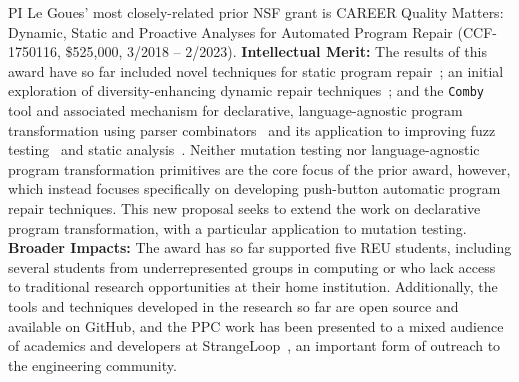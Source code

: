 PI Le Goues' most closely-related prior NSF grant is  CAREER
Quality Matters: Dynamic, Static and Proactive Analyses for Automated Program
Repair (CCF-1750116,  \$525,000,  3/2018 -- 2/2023).  \textbf{Intellectual
  Merit:} The results of this award have so far  
included novel techniques for static program repair~\cite{footpatch}; an initial
exploration of diversity-enhancing dynamic repair
techniques~\cite{Ding2019}; and the {\tt Comby} tool and associated mechanism for
declarative, language-agnostic program transformation using parser
combinators~\cite{rvt-ppc} and its application to improving fuzz testing~\cite{vantonder-ase18} and static analysis~\cite{vanTonder-tailoring20}.  Neither mutation testing nor language-agnostic
program transformation primitives are the core focus of the prior award,
however, which instead focuses specifically on developing push-button automatic
program repair techniques. This new proposal seeks to extend the work on
declarative program transformation, with a particular application to mutation
testing. \textbf{Broader Impacts:} The award has so far supported five REU
students, including several students from underrepresented groups in computing or who lack access to
traditional research opportunities at their
home institution. 
Additionally, the tools and techniques developed in the research so far are open
source and available on GitHub, and the PPC work has been presented to a mixed
audience of academics and developers at StrangeLoop~\cite{strangeloop}, an
important form of outreach to the engineering community.
